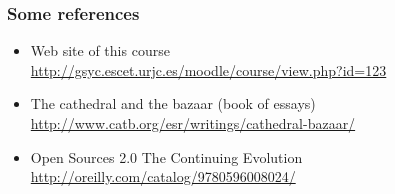 \documentclass{beamer}
\begin{document}
\begin{frame}
\frametitle{Some references}

\begin{itemize}
\item Web site of this course \\
  \url{http://gsyc.escet.urjc.es/moodle/course/view.php?id=123}
\item The cathedral and the bazaar (book of essays) \\
  \url{http://www.catb.org/esr/writings/cathedral-bazaar/}
\item Open Sources 2.0 The Continuing Evolution \\
  \url{http://oreilly.com/catalog/9780596008024/}
\end{itemize}

\end{frame}
\end{document}
